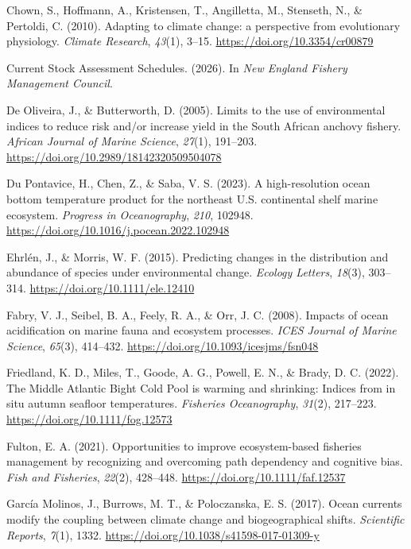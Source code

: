 \documentclass[
  12pt,
]{article}
\newlength{\cslhangindent}
\newenvironment{CSLReferences}[2] %
 {\begin{list}{}{%
  \setlength{\itemindent}{0pt}
  \setlength{\leftmargin}{0pt}
  \setlength{\parsep}{0pt}
  \ifodd #1
   \setlength{\leftmargin}{\cslhangindent}
   \setlength{\itemindent}{-1\cslhangindent}
  \fi
  \setlength{\itemsep}{#2\baselineskip}}}
 {\end{list}}
\begin{document}
\begin{CSLReferences}{1}{2}
Chown, S., Hoffmann, A., Kristensen, T., Angilletta, M., Stenseth, N., \& Pertoldi, C. (2010). Adapting to climate change: a perspective from evolutionary physiology. \emph{Climate Research}, \emph{43}(1), 3--15. \url{https://doi.org/10.3354/cr00879}

Current {Stock Assessment Schedules}. (2026). In \emph{New England Fishery Management Council}.

De Oliveira, J., \& Butterworth, D. (2005). Limits to the use of environmental indices to reduce risk and/or increase yield in the {South African} anchovy fishery. \emph{African Journal of Marine Science}, \emph{27}(1), 191--203. \url{https://doi.org/10.2989/18142320509504078}

Du Pontavice, H., Chen, Z., \& Saba, V. S. (2023). A high-resolution ocean bottom temperature product for the northeast U.S. continental shelf marine ecosystem. \emph{Progress in Oceanography}, \emph{210}, 102948. \url{https://doi.org/10.1016/j.pocean.2022.102948}

Ehrlén, J., \& Morris, W. F. (2015). Predicting changes in the distribution and abundance of species under environmental change. \emph{Ecology Letters}, \emph{18}(3), 303--314. \url{https://doi.org/10.1111/ele.12410}

Fabry, V. J., Seibel, B. A., Feely, R. A., \& Orr, J. C. (2008). Impacts of ocean acidification on marine fauna and ecosystem processes. \emph{ICES Journal of Marine Science}, \emph{65}(3), 414--432. \url{https://doi.org/10.1093/icesjms/fsn048}

Friedland, K. D., Miles, T., Goode, A. G., Powell, E. N., \& Brady, D. C. (2022). The Middle Atlantic Bight Cold Pool is warming and shrinking: Indices from in situ autumn seafloor temperatures. \emph{Fisheries Oceanography}, \emph{31}(2), 217--223. \url{https://doi.org/10.1111/fog.12573}

Fulton, E. A. (2021). Opportunities to improve ecosystem{-}based fisheries management by recognizing and overcoming path dependency and cognitive bias. \emph{Fish and Fisheries}, \emph{22}(2), 428--448. \url{https://doi.org/10.1111/faf.12537}

García Molinos, J., Burrows, M. T., \& Poloczanska, E. S. (2017). Ocean currents modify the coupling between climate change and biogeographical shifts. \emph{Scientific Reports}, \emph{7}(1), 1332. \url{https://doi.org/10.1038/s41598-017-01309-y}


\end{CSLReferences}
\end{document}
